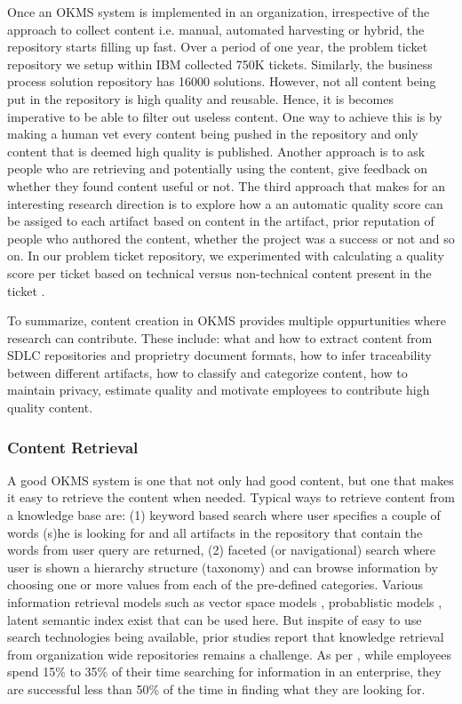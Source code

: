 Once an OKMS system is implemented in an organization, irrespective of the approach to collect content i.e. manual, automated harvesting or hybrid, the repository starts filling up fast. Over a period of one year, the problem ticket repository we setup within IBM collected 750K tickets. Similarly, the business process solution repository has 16000 solutions. However, not all content being put in the repository is high quality and reusable. Hence, it is becomes imperative to be able to filter out useless content. One way to achieve this is by making a human vet every content being pushed in the repository and only content that is deemed high quality is published. Another approach is to ask people who are retrieving and potentially using the content, give feedback on whether they found content useful or not. The third approach that makes for an interesting research direction is to explore how a an automatic quality score can be assiged to each artifact based on content in the artifact, prior reputation of people who authored the content, whether the project was a success or not and so on. In our problem ticket repository, we experimented with calculating a quality score per ticket based on technical versus non-technical content present in the ticket \cite{Majumdar:2011}.

To summarize, content creation in OKMS provides multiple oppurtunities where research can contribute. These include: what and how to extract content from SDLC repositories and proprietry document formats, how to infer traceability between different artifacts, how to classify and categorize content, how to maintain privacy, estimate quality and motivate employees to contribute high quality content. 

\subsubsection{Content Retrieval}

A good OKMS system is one that not only had good content, but one that makes it easy to retrieve the content when needed. Typical ways to retrieve content from a knowledge base are: (1) keyword based search where user specifies a couple of words (s)he is looking for and all artifacts in the repository that contain the words from user query are returned, (2) faceted (or navigational) search where user is shown a hierarchy structure (taxonomy) and can browse information by choosing one or more values from each of the pre-defined categories. Various information retrieval models such as vector space models \cite{}, probablistic models \cite{}, latent semantic index \cite{} exist that can be used here. But inspite of easy to use search technologies being available, prior studies report that knowledge retrieval from organization wide repositories remains a challenge. As per \cite{idc,idc2}, while employees spend 15\% to 35\% of their time searching for information in an enterprise, they are successful less than 50\% of the time in finding what they are looking for. 

